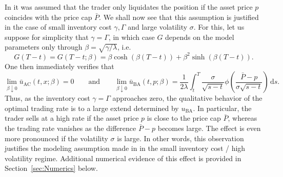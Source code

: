 \documentclass[11pt]{article}
\theoremstyle{definition}
\theoremstyle{remark}
\newcommand{\ts}{\textstyle}
\newcommand{\de}{\,\mathrm{d}}
\begin{document}
In \cite{neuman.schied.16} it was assumed that the trader only liquidates the position if the asset price $p$ coincides with the price cap $\bar P$. We shall now see that this assumption is justified in the case of small inventory cost $\gamma,\Gamma$ and large volatility $\sigma$. For this, let us suppose for simplicity that $\gamma = \Gamma$, in which case $G$ depends on the model parameters only through $\beta = \sqrt{\gamma/\lambda}$, i.e.\
\[
 G(T-t) = G(T-t;\beta) = \beta\cosh(\beta(T-t)) + \beta^2 \sinh(\beta(T-t)).
\]
One then immediately verifies that
\[
 \lim_{\beta\downarrow 0} \bar u_{\mathrm{AC}}(t,x;\beta) = 0\qquad\text{and}\qquad \lim_{\beta\downarrow 0} \bar u_{\mathrm{BA}}(t,p;\beta) = \frac{1}{2\lambda} \int_t^T \frac{\sigma}{\sqrt{s-t}} \phi\left(\frac{\bar{P}-p}{\sigma\sqrt{s-t}} \right) \de s.
\]
Thus, as the inventory cost $\gamma=\Gamma$ approaches zero, the qualitative behavior of the optimal trading rate is to a large extend determined by $u_{\mathrm{BA}}$. In particular, the trader sells at a high rate if the asset price $p$ is close to the price cap $\bar P$, whereas the trading rate vanishes as the difference $\bar P - p$ becomes large. The effect is even more pronounced if the volatility $\sigma$ is large. In other words, this observation justifies the modeling assumption made in \cite{neuman.schied.16} in the small inventory cost / high volatility regime. Additional numerical evidence of this effect is provided in Section~\ref{sec:Numerics} below.



\end{document}

